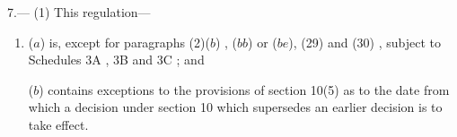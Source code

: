 \documentclass[12pt,a4paper]{article}
\begin{document}
7.—%
%
(1) This regulation---
\begin{enumerate}\item[]


($a$) is, except for 
paragraphs (2)($b$)%
, ($bb$)  %
or ($be$), (29) and (30)%
, subject to Schedules 3A%
, 3B and 3C%
; and

($b$) contains exceptions to the provisions of section 10(5) as to the date from which a decision under section 10 which supersedes an earlier decision is to take effect.
\end{enumerate}
\end{document}
